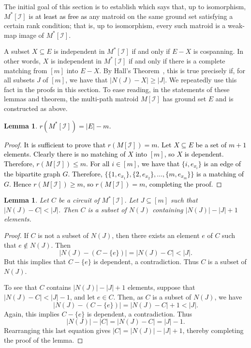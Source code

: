 \documentclass[11pt]{amsart}
\newtheorem{lemma}[theorem]{Lemma}
\newcommand{\blue}{\textcolor{black}}
\newcommand{\bloo}{\textcolor{black}}
\begin{document}
The initial goal of this section is to establish  which says that, up to isomorphism, $M^*[\mathscr I]$ is \blue{at least as free as} any matroid on the same ground set satisfying a certain rank condition; that is, up to isomorphism, every such matroid is a weak-map image of $M^*[\mathscr I]$.


A subset $X \subseteq E$ is independent in $M^*[\mathscr I]$ if and only if $E-X$ is cospanning. In other words, $X$ is independent in $M^*[\mathscr I]$ if and only if there is a complete matching from $[m]$ into $E-X$. By Hall's Theorem~\cite{hal35}, this is true precisely if, for all subsets $J$ of $[m]$, we have that $|N(J)-X| \geq |J|$. We repeatedly use this fact in the proofs in this section. To ease reading, in the statements of these lemmas and theorem, the multi-path matroid $M[\mathscr I]$ has ground set $E$ and is constructed as above.

\begin{lemma} \label{psi_rank}
\bloo{$r(M^*[\mathscr I]) = |E|-m$.}
\end{lemma}

\begin{proof}
\bloo{It is sufficient to prove that $r(M[\mathscr I]) = m$. Let $X \subseteq E$ be a set of $m+1$ elements. Clearly there is no matching of $X$ into $[m]$, so $X$ is dependent. Therefore, $r(M[\mathscr I]) \leq m$. For all $i \in [m]$, we have that $\{i,e_{x_i}\}$ is an edge of the bipartite graph $G$. Therefore, $\{\{1,e_{x_1}\},\{2,e_{x_2}\},\ldots,\{m,e_{x_m}\}\}$ is a matching of $G$. Hence $r(M[\mathscr I]) \geq m$, so $r(M[\mathscr I]) = m$, completing the proof.}
\end{proof}

\begin{lemma}
\label{circuits1}
Let $C$ be a circuit of $M^*[\mathscr I]$. Let $J \subseteq [m]$ such that $\left.|N(J)-C| < |J|\right.$. Then $C$ is a subset of $N(J)$ containing $|N(J)|-|J|+1$ elements.
\end{lemma}

\begin{proof}
If $C$ is not a subset of $N(J)$, then there exists an element $e$ of $C$ such that $e\not\in N(J)$. Then
$$|N(J)-(C-\{e\})| = |N(J)-C| < |J|.$$
But this implies that $C-\{e\}$ is dependent, a contradiction. Thus $C$ is a subset of $N(J)$.

To see that $C$ contains $|N(J)|-|J|+1$ elements, suppose that $\left.|N(J)-C| < |J|-1\right.$, and let $e \in C$. Then, as $C$ is a subset of $N(J)$, we have
$$|N(J)-(C-\{e\})| = |N(J)-C|+1 < |J|.$$
Again, this implies $C-\{e\}$ is dependent, a contradiction. Thus
$$|N(J)|-|C| = |N(J)-C| = |J|-1.$$
Rearranging this last equation gives $|C| = |N(J)|-|J|+1$, thereby completing the proof of the lemma.
\end{proof}
\end{document}
